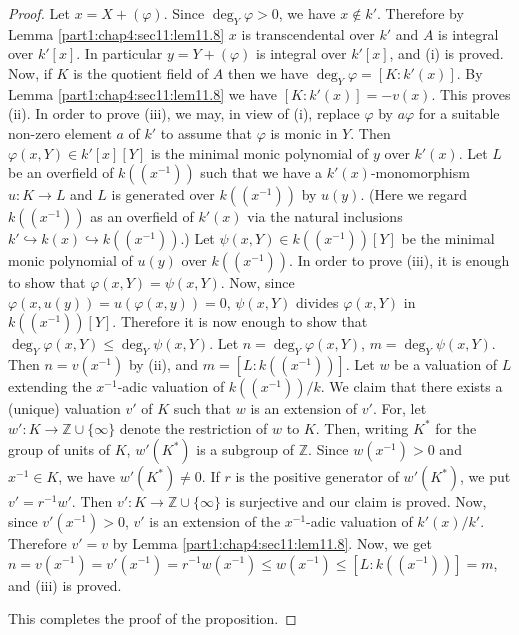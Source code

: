 \begin{proof}
  Let $x= X + (\varphi)$. Since $\deg_Y \varphi > 0$, we have $x
  \notin k'$. Therefore by Lemma \ref{part1:chap4:sec11:lem11.8} $x$
  is transcendental over $k'$ and $A$ is integral over $k'[x]$. In
  particular $y = Y + (\varphi)$ is integral over $k'[x]$, and (i) is
  proved. Now, if $K$ is the quotient field of $A$ then we have
  $\deg_Y \varphi= [K : k'(x)]$. By
  Lemma \ref{part1:chap4:sec11:lem11.8} we have $[K: k'(x)]=-
  v(x)$. This proves (ii). In order to prove (iii), we may, in view of
  (i), replace $\varphi$ by $a \varphi$ for a suitable non-zero
  element $a$ of $k'$ to assume that $\varphi$ is monic in $Y$. Then
  $\varphi (x, Y) \in k' [x][Y]$ is the minimal monic polynomial of
  $y$ over $k'(x)$. Let $L$ be an overfield of $k((x^{-1}))$ such that
  we have a $k'(x)$-monomorphism $u :K \to L$ and $L$ is generated
  over $k((x^{-1}))$ by $u(y)$. (Here we regard $k((x^{-1}))$ as an
  overfield of $k'(x)$  via the natural inclusions $k'
  \hookrightarrow k(x) \hookrightarrow k((x^{-1}))$.) Let $\psi (x, Y)
  \in k((x^{-1})) [Y]$ be the minimal monic polynomial of $u(y)$ over
  $k((x^{-1}))$. In order to prove (iii), it is enough\pageoriginale
  to show that $\varphi (x, Y)= \psi (x, Y)$. Now, since
  $\varphi (x, u(y))= u(\varphi (x, y))=0$, $\psi (x, Y)$
  divides $\varphi (x, Y)$ in $k((x^{-1}))[Y]$. Therefore it is now enough to show that $\deg_Y \varphi (x, Y) \leq
  \deg_Y \psi (x, Y)$. Let $n= \deg_Y \varphi(x, Y)$, $m= \deg_Y \psi
  (x, Y)$. Then $n= v(x^{-1})$ by (ii), and $m= [L :
    k((x^{-1}))]$. Let $w$ be a valuation of $L$ extending the
  $x^{-1}$-adic valuation of $k((x^{-1}))/k$. We claim that there
  exists a (unique) valuation $v'$ of $K$ such that $w$ is an
  extension of $v'$. For, let $w' : K\to \mathbb{Z} \cup \{ \infty\}$
  denote the restriction of $w$ to $K$. Then, writing $K^*$ for the
  group of units of $K$, $w' (K^*)$ is a subgroup of
  $\mathbb{Z}$. Since $w(x^{-1})>0$ and $x^{-1}\in K$, we have $w'
  (K^*)\neq 0$. If $r$ is the positive generator of $w' (K^*)$, we put
  $v' = r^{-1} w'$. Then $v' : K \to \mathbb{Z} \cup \{ \infty\}$ is
  surjective and our claim is proved. Now, since $v' (x^{-1})> 0$,
  $v'$ is an extension of the $x^{-1}$-adic valuation of $k'
  (x)/k'$. Therefore $v'=v$ by Lemma
  \ref{part1:chap4:sec11:lem11.8}. Now, we get $n= v(x^{-1})= v'
  (x^{-1})= r^{-1} w(x^{-1})\leq w (x^{-1}) \leq [L : k
    ((x^{-1}))]=m$, and (iii) is proved.

  This completes the proof of the proposition.
\end{proof}

